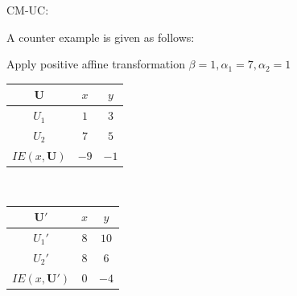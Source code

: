 \documentclass[a4paper]{article}
\begin{document}
CM-UC:

A counter example is given as follows:

Apply positive affine transformation $\beta=1, \alpha_1=7, \alpha_2=1$
\begin{table}[!htbp]
    \centering
    \begin{tabular}{c|cc|}
        $\mathbf{U}$ & $x$ & $y$              \\ 
        \hline
        $U_1$        & $1$ & $3$ \\
        $U_2$        & $7$ & $5$ \\
        \hline
        $IE(x,\mathbf{U})$ & $-9$ & $-1$ \\
    \end{tabular}
    $\qquad\qquad$
    \begin{tabular}{c|cc|}
        $\mathbf{U'}$ & $x$ & $y$              \\ 
        \hline
        $U_1'$        & $8$ & $10$ \\
        $U_2'$        & $8$ & $6$ \\
        \hline
        $IE(x,\mathbf{U}')$ & $0$ & $-4$ \\
    \end{tabular}
\end{table}
\end{document}
